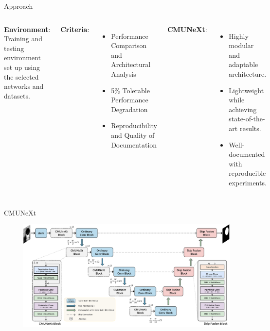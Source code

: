 \documentclass[aspectratio=169,xcolor=dvipsnames]{beamer}
\newcommand{\vtab}{\vspace{0.3cm}}
\begin{document}

\begin{frame}{Approach}
    \begin{columns}[c]
        \textbf{Environment}: Training and testing environment set up using the selected networks and datasets.
        \vtab
        
        \textbf{Criteria}:
        \begin{itemize}
            \item Performance Comparison and Architectural Analysis
            \item 5\% Tolerable Performance Degradation
            \item Reproducibility and Quality of Documentation
        \end{itemize}

        \textbf{CMUNeXt}:
        \begin{itemize}
            \item Highly modular and adaptable architecture.
             \item Lightweight while achieving state-of-the-art results.
            \item Well-documented with reproducible experiments.
        \end{itemize}
        
    \end{columns}
\end{frame}


\begin{frame}{CMUNeXt}
    \begin{figure}
        \includegraphics[width=.9\textwidth]{figures/CMUNeXt.png}
    \end{figure}
\end{frame}
\end{document}
